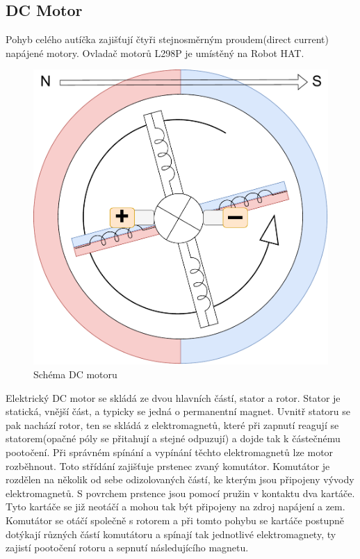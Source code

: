 \subsection*{DC Motor}
Pohyb celého autíčka zajišťují čtyři stejnosměrným proudem(direct current) napájené motory. Ovladač motorů L298P je umístěný na Robot HAT.

\begin{figure}[h!]
	\centering
	\includegraphics[scale=0.50]{obrazky-figures/dc_motor.pdf}
	\caption{Schéma DC motoru}
	\label{}
\end{figure}

Elektrický DC motor se skládá ze dvou hlavních částí, stator a rotor. Stator je statická, vnější část, a typicky se jedná o permanentní magnet. Uvnitř statoru se pak nachází rotor, ten se skládá z elektromagnetů, které při zapnutí reagují se statorem(opačné póly se přitahují a stejné odpuzují) a dojde tak k částečnému pootočení. Při správném spínání a vypínání těchto elektromagnetů lze motor rozběhnout. 
Toto střídání zajišťuje prstenec zvaný komutátor. Komutátor je rozdělen na několik od sebe odizolovaných částí, ke kterým jsou připojeny vývody elektromagnetů. S povrchem prstence jsou pomocí pružin v kontaktu dva kartáče. Tyto kartáče se již neotáčí a mohou tak být připojeny na zdroj napájení a zem. Komutátor se otáčí společně s rotorem a při tomto pohybu se kartáče postupně dotýkají různých částí komutátoru a spínají tak jednotlivé elektromagnety, ty zajistí pootočení rotoru a sepnutí následujícího magnetu. \cite{dc_motor}

